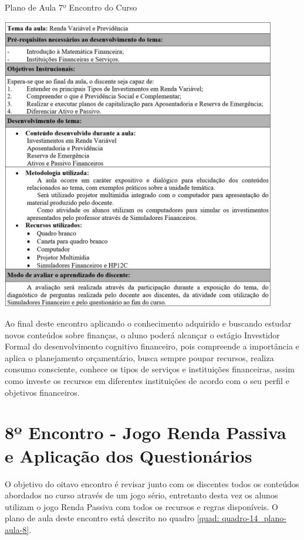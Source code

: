 \graphicspath{{quadros/}} 
\begin{quadro}[!ht]
\centering
\begin{minipage}{1.\textwidth}
\caption{Plano de Aula 7º Encontro do Curso}
\centering
\includegraphics[width=0.9\textwidth]{quadro-13_plano-aula-7}
\label{quad: quadro-13_plano-aula-7}
\end{minipage}
\end{quadro}

Ao final deste encontro aplicando o conhecimento adquirido e buscando estudar novos conteúdos sobre finanças, o aluno poderá alcançar o estágio Investidor Formal do desenvolvimento cognitivo financeiro, pois compreende a importância e aplica o planejamento orçamentário, busca sempre poupar recursos, realiza consumo consciente, conhece os tipos de serviços e instituições financeiras, assim como investe os recursos em diferentes instituições de acordo com o seu perfil e objetivos financeiros.

\section{8º Encontro - Jogo Renda Passiva e Aplicação dos Questionários}
O objetivo do oitavo encontro é revisar junto com os discentes todos os conteúdos abordados no curso através de um jogo sério, entretanto desta vez os alunos utilizam o jogo Renda Passiva com todos os recursos e regras disponíveis. O plano de aula deste encontro está descrito no quadro \ref{quad: quadro-14_plano-aula-8}.


